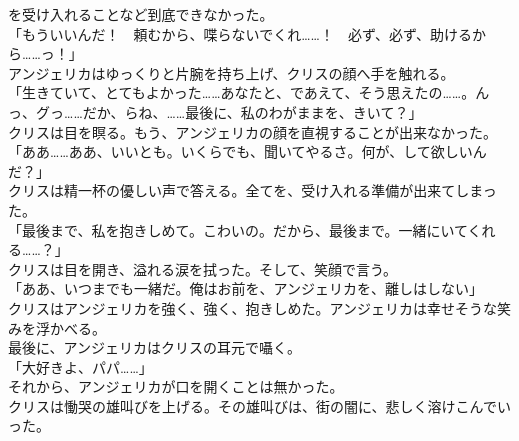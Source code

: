 \documentclass[b5j,10pt,openany]{jsbook}
\begin{document}
を受け入れることなど到底できなかった。\\「もういいんだ！　頼むから、喋らないでくれ\ldots{}\ldots{}！　必ず、必ず、助けるから\ldots{}\ldots{}っ！」\\アンジェリカはゆっくりと片腕を持ち上げ、クリスの顔へ手を触れる。\\「生きていて、とてもよかった\ldots{}\ldots{}あなたと、であえて、そう思えたの\ldots{}\ldots{}。んっ、グっ\ldots{}\ldots{}だか、らね、\ldots{}\ldots{}最後に、私のわがままを、きいて？」\\クリスは目を瞑る。もう、アンジェリカの顔を直視することが出来なかった。\\「ああ\ldots{}\ldots{}ああ、いいとも。いくらでも、聞いてやるさ。何が、して欲しいんだ？」\\クリスは精一杯の優しい声で答える。全てを、受け入れる準備が出来てしまった。\\「最後まで、私を抱きしめて。こわいの。だから、最後まで。一緒にいてくれる\ldots{}\ldots{}？」\\クリスは目を開き、溢れる涙を拭った。そして、笑顔で言う。\\「ああ、いつまでも一緒だ。俺はお前を、アンジェリカを、離しはしない」\\クリスはアンジェリカを強く、強く、抱きしめた。アンジェリカは幸せそうな笑みを浮かべる。\\最後に、アンジェリカはクリスの耳元で囁く。\\「大好きよ、パパ\ldots{}\ldots{}」\\それから、アンジェリカが口を開くことは無かった。\\クリスは慟哭の雄叫びを上げる。その雄叫びは、街の闇に、悲しく溶けこんでいった。
\end{document}
